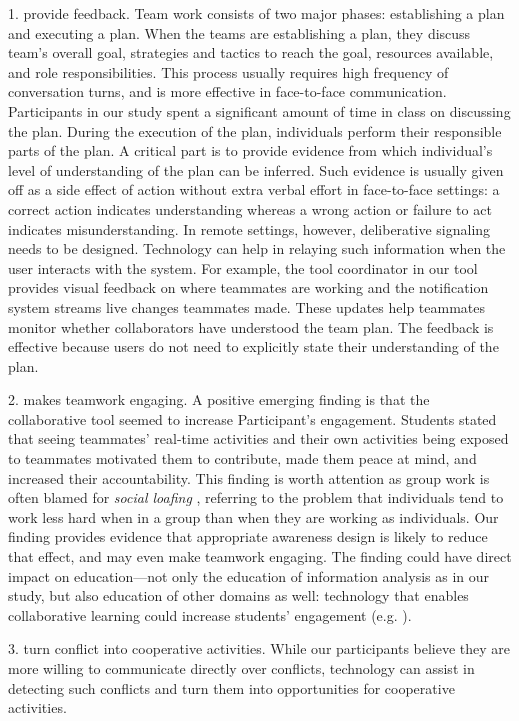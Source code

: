 1. provide feedback. Team work consists of two major phases: establishing a plan and executing a plan. When the teams are establishing a plan, they discuss team's overall goal, strategies and tactics to reach the goal, resources available, and role responsibilities. This process usually requires high frequency of conversation turns, and is more effective in face-to-face communication. Participants in our study spent a significant amount of time in class on discussing the plan. During the execution of the plan, individuals perform their responsible parts of the plan. A critical part is to provide evidence from which individual's level of understanding of the plan can be inferred. Such evidence is usually given off as a side effect of action without extra verbal effort in face-to-face settings: a correct action indicates understanding whereas a wrong action or failure to act indicates misunderstanding. In remote settings, however, deliberative signaling needs to be designed. Technology can help in relaying such information when the user interacts with the system. For example, the tool coordinator in our tool provides visual feedback on where teammates are working and the notification system streams live changes teammates made. These updates help teammates monitor whether collaborators have understood the team plan. The feedback is effective because users do not need to explicitly state their understanding of the plan. 


2. makes teamwork engaging. A positive emerging finding is that the collaborative tool seemed to increase Participant's engagement. Students stated that seeing teammates' real-time activities and their own activities being exposed to teammates motivated them to contribute, made them peace at mind, and increased their accountability. This finding is worth attention as group work is often blamed for \emph{social loafing} \cite{Karau1993},  referring to the problem that individuals tend to work less hard when in a group than when they are working as individuals. Our finding provides evidence that appropriate awareness design is likely to reduce that effect, and may even make teamwork engaging. The finding could have direct impact on education---not only the education of information analysis as in our study, but also education of other domains as well: technology that enables collaborative learning could increase students' engagement (e.g. \cite{zheng2015}). 


3. turn conflict into cooperative activities. While our participants believe they are more willing to communicate directly over conflicts, technology can assist in detecting such conflicts and turn them into opportunities for cooperative activities. 

